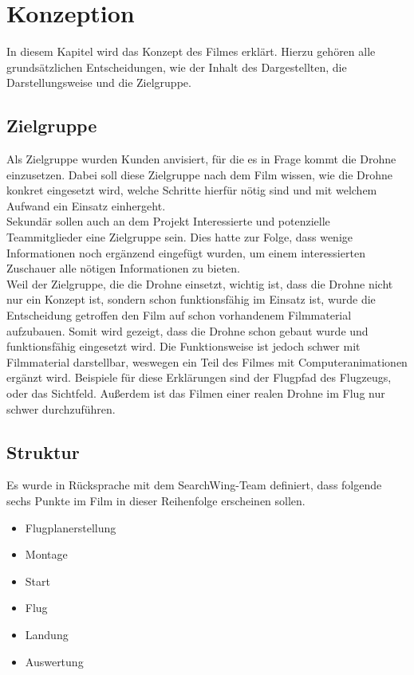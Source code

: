 \chapter{Konzeption}
\label{ch:intro}
In diesem Kapitel wird das Konzept des Filmes erklärt. Hierzu gehören alle grundsätzlichen Entscheidungen, wie der Inhalt des Dargestellten, die Darstellungsweise und die Zielgruppe.

\section{Zielgruppe}
\label{sec:konzept:zielgruppe}


Als Zielgruppe wurden Kunden anvisiert, für die es in Frage kommt die Drohne einzusetzen. Dabei soll diese Zielgruppe nach dem Film wissen, wie die Drohne konkret eingesetzt wird, welche Schritte hierfür nötig sind und mit welchem Aufwand ein Einsatz einhergeht.\\
Sekundär sollen auch an dem Projekt Interessierte und potenzielle Teammitglieder eine Zielgruppe sein. Dies hatte zur Folge, dass wenige Informationen noch ergänzend eingefügt wurden, um einem interessierten Zuschauer alle nötigen Informationen zu bieten.\\
Weil der Zielgruppe, die die Drohne einsetzt, wichtig ist, dass die Drohne nicht nur ein Konzept ist, sondern schon funktionsfähig im Einsatz ist, wurde die Entscheidung getroffen den Film auf schon vorhandenem Filmmaterial aufzubauen. Somit wird gezeigt, dass die Drohne schon gebaut wurde und funktionsfähig eingesetzt wird. Die Funktionsweise ist jedoch schwer mit Filmmaterial darstellbar, weswegen ein Teil des Filmes mit Computeranimationen ergänzt wird. Beispiele für diese Erklärungen sind der Flugpfad des Flugzeugs, oder das Sichtfeld. Außerdem ist das Filmen einer realen Drohne im Flug nur schwer durchzuführen.

\section{Struktur} %
\label{sec:konzept:outline}

Es wurde in Rücksprache mit dem SearchWing-Team definiert, dass folgende sechs Punkte im Film in dieser Reihenfolge erscheinen sollen.

\begin{itemize}
\setlength\itemsep{0pt}
\item{Flugplanerstellung}
\item{Montage}
\item{Start}
\item{Flug}
\item{Landung}
\item{Auswertung}
\end{itemize}

